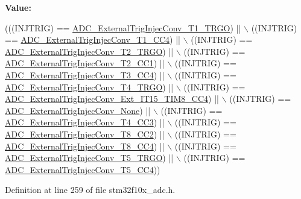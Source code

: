 {\bfseries Value\+:}
\begin{DoxyCode}
(((INJTRIG) == \hyperlink{group___a_d_c__external__trigger__sources__for__injected__channels__conversion_gabf47f66e60c166f6b63b805f72ad94b0}{ADC\_ExternalTrigInjecConv\_T1\_TRGO}) || \(\backslash\)
                                        ((INJTRIG) == 
      \hyperlink{group___a_d_c__external__trigger__sources__for__injected__channels__conversion_gabd27bcc6ff5af6713a124b3801759bcf}{ADC\_ExternalTrigInjecConv\_T1\_CC4}) || \(\backslash\)
                                        ((INJTRIG) == 
      \hyperlink{group___a_d_c__external__trigger__sources__for__injected__channels__conversion_gaaad112b2b035dfd77c9743197c51b16f}{ADC\_ExternalTrigInjecConv\_T2\_TRGO}) || \(\backslash\)
                                        ((INJTRIG) == 
      \hyperlink{group___a_d_c__external__trigger__sources__for__injected__channels__conversion_ga49089501c5bf2a2c22019fbca4b688e9}{ADC\_ExternalTrigInjecConv\_T2\_CC1}) || \(\backslash\)
                                        ((INJTRIG) == 
      \hyperlink{group___a_d_c__external__trigger__sources__for__injected__channels__conversion_ga6c9ddf9bba0cefe77dbcd601aed24f7b}{ADC\_ExternalTrigInjecConv\_T3\_CC4}) || \(\backslash\)
                                        ((INJTRIG) == 
      \hyperlink{group___a_d_c__external__trigger__sources__for__injected__channels__conversion_gab12e5503085cdb9dde4a59614e421284}{ADC\_ExternalTrigInjecConv\_T4\_TRGO}) || \(\backslash\)
                                        ((INJTRIG) == 
      \hyperlink{group___a_d_c__external__trigger__sources__for__injected__channels__conversion_gaa23965b742e08142e5d1c453166dbcc2}{ADC\_ExternalTrigInjecConv\_Ext\_IT15\_TIM8\_CC4}) || \(\backslash\)
                                        ((INJTRIG) == 
      \hyperlink{group___a_d_c__external__trigger__sources__for__injected__channels__conversion_gaad11a68fca76d97b97dc2554dac5cb16}{ADC\_ExternalTrigInjecConv\_None}) || \(\backslash\)
                                        ((INJTRIG) == 
      \hyperlink{group___a_d_c__external__trigger__sources__for__injected__channels__conversion_gae342ca48595f0b2bf866943969026581}{ADC\_ExternalTrigInjecConv\_T4\_CC3}) || \(\backslash\)
                                        ((INJTRIG) == 
      \hyperlink{group___a_d_c__external__trigger__sources__for__injected__channels__conversion_gac0320df9aa5e2d378b05f8e4dcc1616a}{ADC\_ExternalTrigInjecConv\_T8\_CC2}) || \(\backslash\)
                                        ((INJTRIG) == 
      \hyperlink{group___a_d_c__external__trigger__sources__for__injected__channels__conversion_ga6724679fe75f87c029f268ef47841a3e}{ADC\_ExternalTrigInjecConv\_T8\_CC4}) || \(\backslash\)
                                        ((INJTRIG) == 
      \hyperlink{group___a_d_c__external__trigger__sources__for__injected__channels__conversion_ga1d92236e9eb9f3adf69371f3f698192e}{ADC\_ExternalTrigInjecConv\_T5\_TRGO}) || \(\backslash\)
                                        ((INJTRIG) == 
      \hyperlink{group___a_d_c__external__trigger__sources__for__injected__channels__conversion_gade68a960ba05714e5f0a1f11a086884e}{ADC\_ExternalTrigInjecConv\_T5\_CC4}))
\end{DoxyCode}


Definition at line 259 of file stm32f10x\+\_\+adc.\+h.

